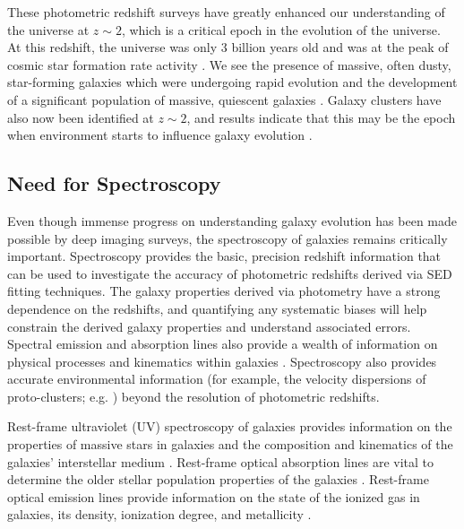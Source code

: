 \documentclass[iop]{emulateapj}
\begin{document}
These photometric redshift surveys have greatly enhanced our understanding of the universe at $z\sim2$, which is a critical epoch in the evolution of the universe. At this redshift, the universe was only 3 billion years old and was at the peak of cosmic star formation rate activity \citep{Hopkins2006,Lee2015}. We see the presence of massive, often dusty, star-forming galaxies
\citep{Spitler2014,Reddy2015} which were undergoing rapid evolution and the development of a significant
population of massive, quiescent galaxies \citep{vanDokkum2008,Damjanov2009}.
Galaxy clusters have also now been identified at $z\sim2$, and results
indicate that this may be the epoch when environment starts to influence galaxy evolution \citep{Gobat2011,Spitler2012,Yuan2014,Casey2015}. 

\subsection{Need for Spectroscopy}

Even though immense progress on understanding galaxy evolution has been made possible by deep imaging surveys, the spectroscopy of galaxies remains critically important. Spectroscopy provides the basic, precision redshift information that can be used to investigate the accuracy of photometric redshifts derived via SED fitting techniques. The galaxy properties derived via photometry have a strong dependence on the redshifts, and quantifying any systematic biases will help constrain the derived galaxy properties and understand associated errors. 
Spectral emission and absorption lines also provide a wealth of information on physical processes  and kinematics within galaxies \citep{Shapley2009}. Spectroscopy also provides accurate environmental information (for example, the velocity dispersions of proto-clusters; e.g. \cite{Yuan2014})  beyond the resolution of photometric redshifts.

Rest-frame ultraviolet (UV) spectroscopy of galaxies provides information on the properties of massive stars in galaxies and the composition and kinematics of the galaxies' interstellar medium \citep[ISM;][]{Dessauges2010,Quider2010}. 
Rest-frame optical absorption lines are vital to determine the older stellar population properties of the galaxies \citep[eg.,][]{vandeSande2011,Belli2014}. Rest-frame optical emission lines provide information on the state of the ionized gas in galaxies, its density, ionization degree, and metallicity \citep{Pettini2004,Steidel2014,Kacprzak2015,Kewley2016,Shimakawa2015}.
\end{document}
